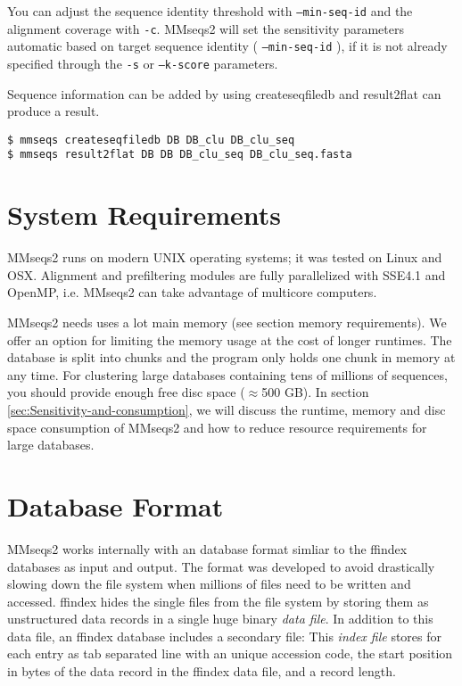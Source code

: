 \documentclass[11pt,a4paper]{scrreprt}
\begin{document}
You can adjust the sequence identity threshold with \texttt{--min-seq-id} and the alignment coverage with \texttt{-c}. MMseqs2 will set the sensitivity parameters automatic based on target sequence identity ( \texttt{--min-seq-id} ), if it is not already specified through the \texttt{-s} or \texttt{--k-score} parameters.


Sequence information can be added by using createseqfiledb and result2flat can produce a result.


\begin{verbatim}
$ mmseqs createseqfiledb DB DB_clu DB_clu_seq
$ mmseqs result2flat DB DB DB_clu_seq DB_clu_seq.fasta
\end{verbatim}
\section{System Requirements}
MMseqs2 runs on modern UNIX operating systems; it was tested on Linux and OSX. Alignment and prefiltering modules are fully parallelized with SSE4.1 and OpenMP, i.e. MMseqs2 can take advantage of multicore computers. 


MMseqs2 needs uses a lot main memory (see section memory requirements). We offer an option for limiting the memory usage at the cost of longer runtimes. The database is split into chunks and the program only holds one chunk in memory at any time. For clustering large databases containing tens of millions of sequences, you should provide enough free disc space ($\approx$500 GB). In section \ref{sec:Sensitivity-and-consumption}, we will discuss the runtime, memory and disc space consumption of MMseqs2 and how to reduce resource requirements for large databases.
\section{Database Format}
MMseqs2 works internally with an database format simliar to the ffindex databases as input and output. The format was developed to avoid drastically slowing down the file system when millions of files need to be written and accessed. ffindex hides the single files from the file system by storing them as unstructured data records in a single huge binary \emph{data file}. In addition to this data file, an ffindex database includes a secondary file: This \emph{index file} stores for each entry as tab separated line with an unique accession code, the start position in bytes of the data record in the ffindex data file, and a record length.
\end{document}
